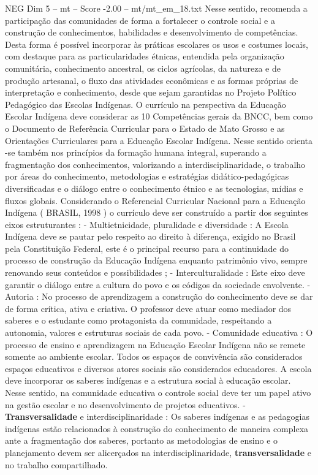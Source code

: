 \begin{textsample}{NEG Dim 5 – mt – Score -2.00 – mt/mt\_em\_18.txt}
Nesse sentido, recomenda a participação das comunidades de forma a fortalecer o controle social e a construção de conhecimentos, habilidades e desenvolvimento de competências.
Desta forma é possível incorporar às práticas escolares os usos e costumes locais, com destaque para as particularidades étnicas, entendida pela organização comunitária, conhecimento ancestral, os ciclos agrícolas, da natureza e de produção artesanal, o fluxo das atividades econômicas e as formas próprias de interpretação e conhecimento, desde que sejam garantidas no Projeto Político Pedagógico das Escolas Indígenas.
O currículo na perspectiva da Educação Escolar Indígena deve considerar as 10 Competências gerais da BNCC, bem como o Documento de Referência Curricular para o Estado de Mato Grosso e as Orientações Curriculares para a Educação Escolar Indígena.
Nesse sentido orienta -se também nos princípios da formação humana integral, superando a fragmentação dos conhecimentos, valorizando a interdisciplinaridade, o trabalho por áreas do conhecimento, metodologias e estratégias didático-pedagógicas diversificadas e o diálogo entre o conhecimento étnico e as tecnologias, mídias e fluxos globais.
Considerando o Referencial Curricular Nacional para a Educação Indígena ( BRASIL, 1998 ) o currículo deve ser construído a partir dos seguintes eixos estruturantes : - Multietnicidade, pluralidade e diversidade : A Escola Indígena deve se pautar pelo respeito ao direito à diferença, exigido no Brasil pela Constituição Federal, este é o principal recurso para a continuidade do processo de construção da Educação Indígena enquanto patrimônio vivo, sempre renovando seus conteúdos e possibilidades ; - Interculturalidade : Este eixo deve garantir o diálogo entre a cultura do povo e os códigos da sociedade envolvente. - Autoria : No processo de aprendizagem a construção do conhecimento deve se dar de forma crítica, ativa e criativa.
O professor deve atuar como mediador dos saberes e o estudante como protagonista da comunidade, respeitando a autonomia, valores e estruturas sociais de cada povo. - Comunidade educativa : O processo de ensino e aprendizagem na Educação Escolar Indígena não se remete somente ao ambiente escolar.
Todos os espaços de convivência são considerados espaços educativos e diversos atores sociais são considerados educadores.
A escola deve incorporar os saberes indígenas e a estrutura social à educação escolar.
Nesse sentido, na comunidade educativa o controle social deve ter um papel ativo na gestão escolar e no desenvolvimento de projetos educativos. - \textbf{Transversalidade} e interdisciplinaridade : Os saberes indígenas e as pedagogias indígenas estão relacionados à construção do conhecimento de maneira complexa ante a fragmentação dos saberes, portanto as metodologias de ensino e o planejamento devem ser alicerçados na interdisciplinaridade, \textbf{transversalidade} e no trabalho compartilhado.

\end{textsample}
